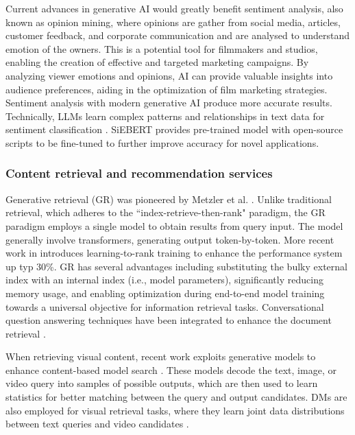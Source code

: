 \documentclass[11pt,a4paper]{article}
\begin{document}
Current advances in generative AI would greatly benefit sentiment analysis, also known as opinion mining, where opinions are gather from social media, articles, customer feedback, and corporate communication and are analysed to understand emotion of the owners. This is a potential tool for filmmakers and studios, enabling the creation of effective and targeted marketing campaigns. By analyzing viewer emotions and opinions, AI can provide valuable insights into audience preferences, aiding in the optimization of film marketing strategies. Sentiment analysis with modern generative AI produce more accurate results. Technically, LLMs learn complex patterns and relationships in text data for sentiment classification \cite{Mao:Biases:2023, krugmann:sentiment:2024}. SiEBERT \cite{Hartmann:More:2023} provides pre-trained model with open-source scripts to be fine-tuned to further improve accuracy for novel applications.

\subsubsection{Content retrieval and recommendation services}

Generative retrieval (GR) was pioneered by Metzler et al. \cite{Metzler:Rethinking:2021}. Unlike traditional retrieval, which adheres to the ``index-retrieve-then-rank" paradigm, the GR paradigm employs a single model to obtain results from query input. The model generally involve transformers, generating output token-by-token. More recent work in \cite{li2024learning} introduces learning-to-rank training to enhance the performance system up typ 30\%.
GR has several advantages including substituting the bulky external index with an internal index (i.e., model parameters), significantly reducing memory usage, and enabling optimization during end-to-end model training towards a universal objective for information retrieval tasks. Conversational question answering techniques have been integrated to enhance the document retrieval \cite{li:unigen:2024}. 

When retrieving visual content, recent work exploits generative models to enhance content-based model search \cite{Lu:content:2023}. These models decode the text, image, or video query into samples of possible outputs, which are then used to learn statistics for better matching between the query and output candidates. DMs are also employed for visual retrieval tasks, where they learn joint data distributions between text queries and video candidates \cite{Jin:DiffusionRet:2023}.
\end{document}
